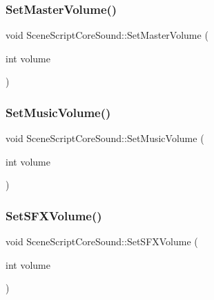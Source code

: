 \subsubsection{\texorpdfstring{Set\+Master\+Volume()}{SetMasterVolume()}}
{\footnotesize\ttfamily void Scene\+Script\+Core\+Sound\+::\+Set\+Master\+Volume (\begin{DoxyParamCaption}\item[{int}]{volume }\end{DoxyParamCaption})}

\hypertarget{class_scene_script_core_sound_a0f6cb5dd78736323d58d527136c833cf}{}\label{class_scene_script_core_sound_a0f6cb5dd78736323d58d527136c833cf} 
\subsubsection{\texorpdfstring{Set\+Music\+Volume()}{SetMusicVolume()}}
{\footnotesize\ttfamily void Scene\+Script\+Core\+Sound\+::\+Set\+Music\+Volume (\begin{DoxyParamCaption}\item[{int}]{volume }\end{DoxyParamCaption})}

\hypertarget{class_scene_script_core_sound_a6d388d0014651549decb4a7a981c24da}{}\label{class_scene_script_core_sound_a6d388d0014651549decb4a7a981c24da} 
\subsubsection{\texorpdfstring{Set\+S\+F\+X\+Volume()}{SetSFXVolume()}}
{\footnotesize\ttfamily void Scene\+Script\+Core\+Sound\+::\+Set\+S\+F\+X\+Volume (\begin{DoxyParamCaption}\item[{int}]{volume }\end{DoxyParamCaption})}

